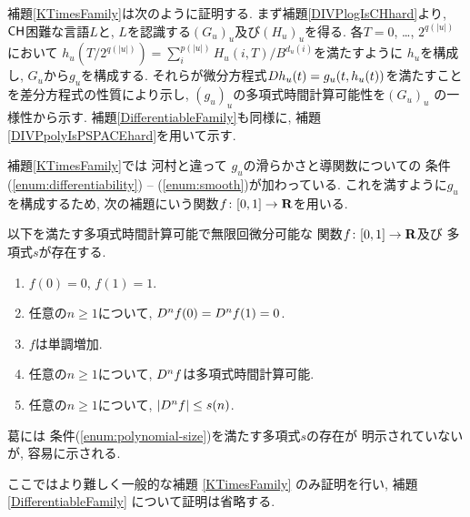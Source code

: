 補題\ref{KTimesFamily}は次のように証明する.
まず補題\ref{DIVPlogIsCHhard}より, 
$\mathsf{CH}$困難な言語$L$と, 
$L$を認識する$(G_u)_u$及び$(H_u)_u$を得る.
各$T = 0$, \ldots, $2^{q(|u|)}$において
$h_u(T/2^{q(|u|)}) = \sum^{p(|u|)}_{i}H_u(i, T)/B^{d_u(i)}$を満たすように
$h_u$を構成し, $G_u$から$g_u$を構成する.
 それらが微分方程式$D h_u(t) = g_u(t, h_u(t))$を満たすことを差分方程式の性質により示し,
 $(g_u)_u$の多項式時間計算可能性を$(G_u)_u$ の一様性から示す.
補題\ref{DifferentiableFamily}も同様に, 
補題\ref{DIVPpolyIsPSPACEhard}を用いて示す. 

 補題\ref{KTimesFamily}では
 河村\cite[補題4.1]{kawamura2010lipschitz}と違って
 $g _u$の滑らかさと導関数についての
 条件(\ref{enum:differentiability}) -- (\ref{enum:smooth})が加わっている.
 これを満すように$g_u$を構成するため, 
 次の補題にいう関数$f \colon [0,1] \to \mathbf R$を用いる. 

 \begin{lemma}
  \label{SmoothFunction}
  以下を満たす多項式時間計算可能で無限回微分可能な
  関数$f \colon [0,1] \to \mathbf R$及び
  多項式$s$が存在する.
  \begin{enumerate}
   \item $f(0) = 0$, $f(1) = 1$. 
   \item 任意の$n \ge 1$について, $D ^n f (0) = D ^n f (1) = 0$. 
   \item $f$は単調増加. 
   \item 任意の$n \ge 1$について, $D ^n f$は多項式時間計算可能.
   \item \label{enum:polynomial-size}
     任意の$n \ge 1$について, $|D^n f| \le s(n)$. 
  \end{enumerate}
 \end{lemma}

葛\cite[補題3.6]{ko1991complexity}には
条件(\ref{enum:polynomial-size})を満たす多項式$s$の存在が
明示されていないが, 
容易に示される.

 ここではより難しく一般的な補題 \ref{KTimesFamily} のみ証明を行い,
 補題 \ref{DifferentiableFamily} について証明は省略する.



